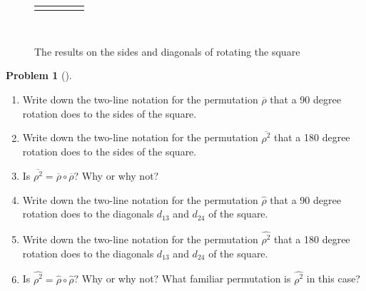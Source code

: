 \documentclass[10pt,]{book}
\theoremstyle{plain}
\theoremstyle{definition}
\newtheorem{activity}[project]{Problem}
\theoremstyle{definition}
\numberwithin{equation}{chapter}
\newlength{\panelmax}
\begin{document}
\begin{figure}
{\leavevmode%
\setlength{\tabcolsep}{0.005\linewidth}
\par\medskip\noindent
\hspace*{0.005\linewidth}%
\begin{tabular}{@{}*{5}{c}@{}}
\begin{minipage}[c][\panelmax][t]{0.19\linewidth}\usebox{\panelboxAGimage}\end{minipage}&
\begin{minipage}[c][\panelmax][t]{0.19\linewidth}\usebox{\panelboxAHimage}\end{minipage}&
\begin{minipage}[c][\panelmax][t]{0.19\linewidth}\usebox{\panelboxAIimage}\end{minipage}&
\begin{minipage}[c][\panelmax][t]{0.19\linewidth}\usebox{\panelboxAJimage}\end{minipage}&
\begin{minipage}[c][\panelmax][t]{0.19\linewidth}\usebox{\panelboxAKimage}\end{minipage}\end{tabular}\\
}%
\caption{The results on the sides and diagonals of rotating the square\label{rotate-square}}
\end{figure}
\begin{activity}[]\marginsymbol[-1em]{} \label{activity-279}
\leavevmode%
\begin{enumerate}[font=\bfseries,label=(\alph*),ref=\alph*]
\item\label{task-199} \marginsymbol[-2.5em]{} Write down the two-line notation for the permutation \(\overline{\rho}\) that a \(90\) degree rotation does to the sides of the square.%
\item\label{task-200} \marginsymbol[-2.5em]{} Write down the two-line notation for the permutation \(\overline{\rho^2}\) that  a 180 degree rotation does to the sides of the square.%
\item\label{task-201} \marginsymbol[-2.5em]{} Is \(\overline{\rho^2} = \overline\rho\circ\overline\rho\)? Why or why not?%
\item\label{task-202} \marginsymbol[-2.5em]{} Write down the two-line notation for the permutation \(\widehat{\rho}\) that a 90 degree rotation does to the diagonals \(d_{13}\) and \(d_{24}\) of the square.%
\item\label{task-203} \marginsymbol[-2.5em]{} Write down the two-line notation for the permutation \(\widehat{\rho^2}\) that a 180 degree rotation does to the diagonals \(d_{13}\) and \(d_{24}\) of the square.%
\item\label{task-204} \marginsymbol[-2.5em]{} Is \(\widehat{\rho^2} = \widehat{\rho}\circ\widehat{\rho}\)? Why or why not? What familiar permutation is \(\widehat{\rho^2}\) in this case?%
\end{enumerate}
\end{activity}
\end{document}

